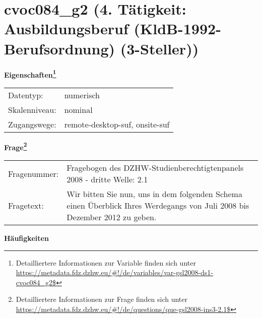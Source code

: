 
    \setcounter{footnote}{0}

    \vspace*{-1.8cm}
	\section{cvoc084\_g2 (4. Tätigkeit: Ausbildungsberuf (KldB-1992-Berufsordnung) (3-Steller))}
	\label{section:cvoc084_g2}



    \vspace*{0.5cm}
    \noindent\textbf{Eigenschaften\footnote{Detailliertere Informationen zur Variable finden sich unter
		\url{https://metadata.fdz.dzhw.eu/\#!/de/variables/var-gsl2008-ds1-cvoc084_g2$}}}\\
	\begin{tabularx}{\hsize}{@{}lX}
	Datentyp: & numerisch \\
	Skalenniveau: & nominal \\
	Zugangswege: &
	  remote-desktop-suf, 
	  onsite-suf
 \\
    \end{tabularx}



				\vspace*{0.5cm}
                \noindent\textbf{Frage\footnote{Detailliertere Informationen zur Frage finden sich unter
		              \url{https://metadata.fdz.dzhw.eu/\#!/de/questions/que-gsl2008-ins3-2.1$}}}\\
				\begin{tabularx}{\hsize}{@{}lX}
					Fragenummer: &
					  Fragebogen des DZHW-Studienberechtigtenpanels 2008 - dritte Welle:
					  2.1
 \\
					Fragetext: & Wir bitten Sie nun, uns in dem folgenden Schema einen Überblick Ihres Werdegangs von Juli 2008 bis Dezember 2012 zu geben. \\
				\end{tabularx}





        		\vspace*{0.5cm}
                \noindent\textbf{Häufigkeiten}


